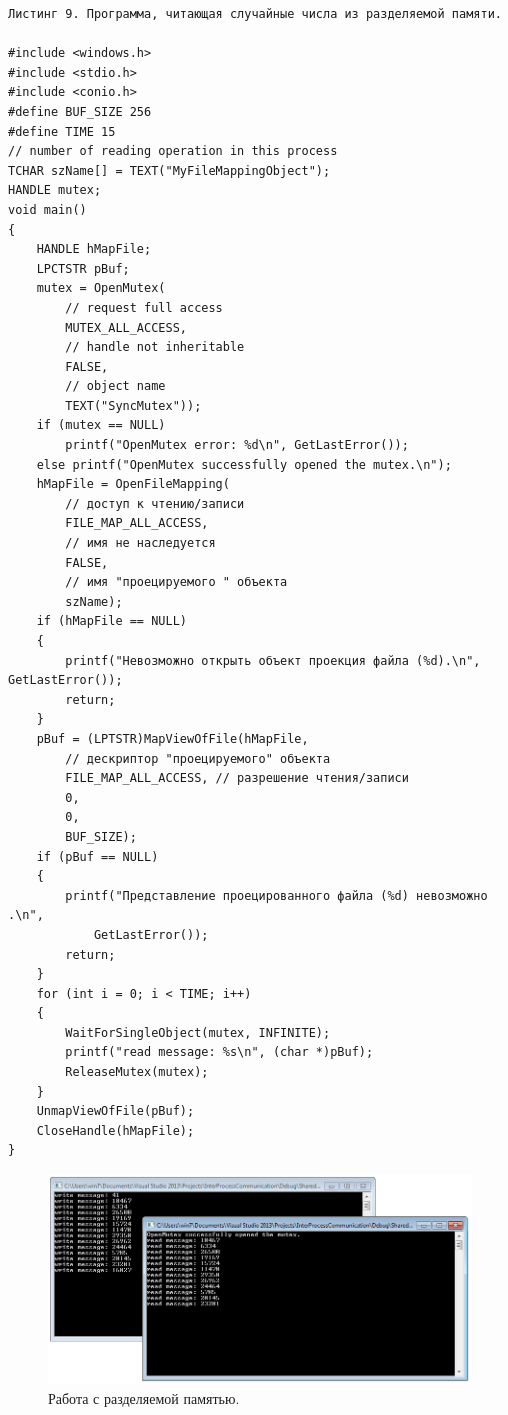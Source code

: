 \documentclass[a4paper,12pt]{article} %
\begin{document}
\begin{verbatim}
Листинг 9. Программа, читающая случайные числа из разделяемой памяти.

#include <windows.h>
#include <stdio.h>
#include <conio.h>
#define BUF_SIZE 256
#define TIME 15
// number of reading operation in this process
TCHAR szName[] = TEXT("MyFileMappingObject");
HANDLE mutex;
void main()
{
    HANDLE hMapFile;
    LPCTSTR pBuf;
    mutex = OpenMutex(
        // request full access
        MUTEX_ALL_ACCESS,
        // handle not inheritable
        FALSE,
        // object name
        TEXT("SyncMutex"));
    if (mutex == NULL)
        printf("OpenMutex error: %d\n", GetLastError());
    else printf("OpenMutex successfully opened the mutex.\n");
    hMapFile = OpenFileMapping(
        // доступ к чтению/записи
        FILE_MAP_ALL_ACCESS,
        // имя не наследуется
        FALSE,
        // имя "проецируемого " объекта
        szName);
    if (hMapFile == NULL)
    {
        printf("Невозможно открыть объект проекция файла (%d).\n", GetLastError());
        return;
    }
    pBuf = (LPTSTR)MapViewOfFile(hMapFile,
        // дескриптор "проецируемого" объекта
        FILE_MAP_ALL_ACCESS, // разрешение чтения/записи
        0,
        0,
        BUF_SIZE);
    if (pBuf == NULL)
    {
        printf("Представление проецированного файла (%d) невозможно .\n",
            GetLastError());
        return;
    }
    for (int i = 0; i < TIME; i++)
    {
        WaitForSingleObject(mutex, INFINITE);
        printf("read message: %s\n", (char *)pBuf);
        ReleaseMutex(mutex);
    }
    UnmapViewOfFile(pBuf);
    CloseHandle(hMapFile);
}

\end{verbatim}

\begin{figure}[h!]
\centering
\includegraphics[scale=0.8]{img/05_Sharedmemory}
\caption{Работа с разделяемой памятью.}
\end{figure}
\end{document}
